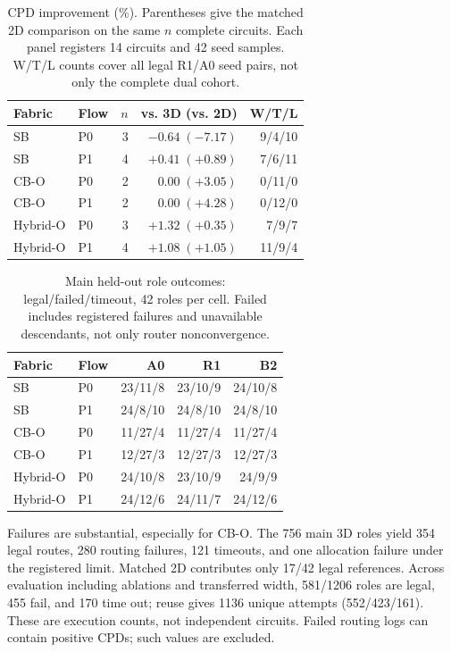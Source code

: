 \documentclass[conference,10pt]{IEEEtran}
\begin{document}
\begin{table}[h]
\centering\caption{CPD improvement (\%). Parentheses give the matched 2D comparison on the same $n$ complete circuits. Each panel registers 14 circuits and 42 seed samples. W/T/L counts cover all legal R1/A0 seed pairs, not only the complete dual cohort.}
\label{tab:main}
\begin{tabular}{llrrr}\hline
Fabric & Flow & $n$ & vs. 3D (vs. 2D) & W/T/L\\\hline
SB & P0 &3&$-0.64\;(-7.17)$&9/4/10\\
SB & P1 &4&$+0.41\;(+0.89)$&7/6/11\\
CB-O & P0 &2&$0.00\;(+3.05)$&0/11/0\\
CB-O & P1 &2&$0.00\;(+4.28)$&0/12/0\\
Hybrid-O & P0 &3&$+1.32\;(+0.35)$&7/9/7\\
Hybrid-O & P1 &4&$+1.08\;(+1.05)$&11/9/4\\\hline
\end{tabular}
\end{table}

\begin{table}[h]
\centering\caption{Main held-out role outcomes: legal/failed/timeout, 42 roles per cell. Failed includes registered failures and unavailable descendants, not only router nonconvergence.}
\label{tab:coverage}
\begin{tabular}{llrrr}\hline
Fabric&Flow&A0&R1&B2\\\hline
SB&P0&23/11/8&23/10/9&24/10/8\\
SB&P1&24/8/10&24/8/10&24/8/10\\
CB-O&P0&11/27/4&11/27/4&11/27/4\\
CB-O&P1&12/27/3&12/27/3&12/27/3\\
Hybrid-O&P0&24/10/8&23/10/9&24/9/9\\
Hybrid-O&P1&24/12/6&24/11/7&24/12/6\\\hline
\end{tabular}
\end{table}
Failures are substantial, especially for CB-O. The 756 main 3D roles yield 354 legal routes, 280 routing failures, 121 timeouts, and one allocation failure under the registered limit. Matched 2D contributes only 17/42 legal references. Across evaluation including ablations and transferred width, 581/1206 roles are legal, 455 fail, and 170 time out; reuse gives 1136 unique attempts (552/423/161). These are execution counts, not independent circuits. Failed routing logs can contain positive CPDs; such values are excluded.
\end{document}
